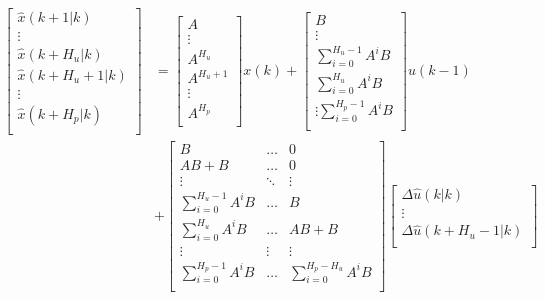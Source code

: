 \begin{equation}
\begin{aligned}
	  \begin{bmatrix}
	  \hat{x}(k+1|k) \\
	  \vdots \\
	  \hat{x}(k+H_u|k) \\
	  \hat{x}(k+H_u +1|k) \\
	  \vdots \\
	  \hat{x}(k+H_p|k) \\
	   \end{bmatrix}
	 &=
	\begin{bmatrix}
		A \\
		\vdots \\
		A^{H_u} \\
		A^{H_u+1} \\
		\vdots \\
		A^{H_p} \\
	\end{bmatrix}
	x(k)+
	\begin{bmatrix}
		B\\
		\vdots \\
		\sum_{i=0}^{H_u-1}A^i B \\
		\sum_{i=0}^{H_u}A^i B \\
		\vdots
		\sum_{i=0}^{H_p-1}A^i B \\
    \end{bmatrix}
    u(k-1) \\ &+ 
    \begin{bmatrix}
    	B & \hdots & 0 \\
    	AB+B & \hdots & 0 \\
    	\vdots & \ddots & \vdots \\
    	\sum_{i=0}^{H_u-1}A^i B & \hdots & B \\
    	\sum_{i=0}^{H_u}A^i B & \hdots & AB+B\\
    	\vdots & \vdots & \vdots \\
    	\sum_{i=0}^{H_p-1}A^i B & \hdots & \sum_{i=0}^{H_p-H_u}A^i B \\
	\end{bmatrix}
	\begin{bmatrix}
		\Delta \hat{u}(k|k)\\
		\vdots \\
		\Delta \hat{u}(k+H_u-1|k)\\
	\end{bmatrix}
	\end{aligned}
\end{equation}


